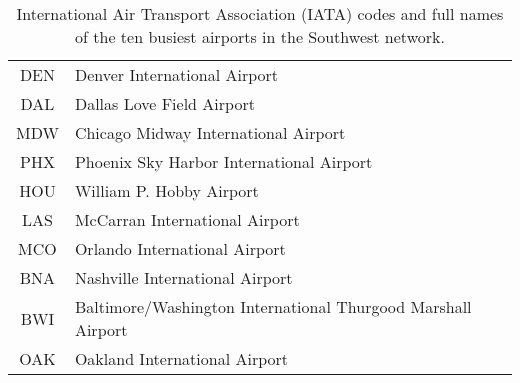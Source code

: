 \begin{table}[htb]
    \caption{International Air Transport Association (IATA) codes and full names of the ten busiest airports in the Southwest network.}
    \label{ch:icml:tab:airport_codes}
    \begin{center}
        \begin{small}
            \begin{tabular}{cl}
                \toprule
                DEN & Denver International Airport                                 \\
                DAL & Dallas Love Field Airport                                    \\
                MDW & Chicago Midway International Airport                         \\
                PHX & Phoenix Sky Harbor International Airport                     \\
                HOU & William P. Hobby Airport                                     \\
                LAS & McCarran International Airport                               \\
                MCO & Orlando International Airport                                \\
                BNA & Nashville International Airport                              \\
                BWI & Baltimore/Washington International Thurgood Marshall Airport \\
                OAK & Oakland International Airport                                \\
                \bottomrule
            \end{tabular}
        \end{small}
    \end{center}
\end{table}